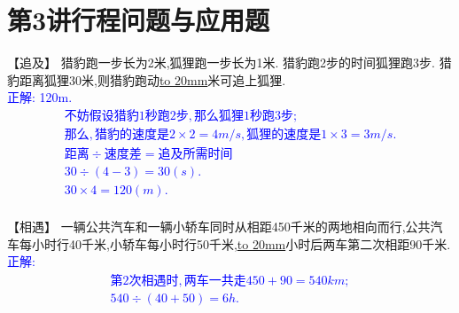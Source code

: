 \section{第3讲\quad 行程问题与应用题}

\item {
    【追及】
    猎豹跑一步长为2米,狐狸跑一步长为1米. 猎豹跑2步的时间狐狸跑3步. 猎豹距离狐狸30米,则猎豹跑动\underline{\hbox to 20mm{}}米可追上狐狸. 
    \ifshowSolution 
        \fangsong{}\textcolor{blue}{
            \\正解: 120m.\\
            \begin{gather*}
                不妨假设猎豹1秒跑2步,那么狐狸1秒跑3步;\\
                那么,猎豹的速度是 2\times 2 = 4m/s, 狐狸的速度是 1\times 3 = 3 m/s. \\
                距离\div 速度差 = 追及所需时间\\
                30\div (4-3) = 30(s). \\
                30 \times 4 = 120 (m).\\
            \end{gather*}
        }
    \else
        \vspace{1cm}
    \fi
}

\item {
    【相遇】
    一辆公共汽车和一辆小轿车同时从相距450千米的两地相向而行,公共汽车每小时行40千米,小轿车每小时行50千米,\underline{\hbox to 20mm{}}小时后两车第二次相距90千米. 
    \ifshowSolution 
        \fangsong{}\textcolor{blue}{
            \\正解: \\
            \begin{gather*}
                第2次相遇时,两车一共走 450+90=540 km;\\
                540\div (40+50) = 6h.\\
            \end{gather*}
        }
    \else
        \vspace{1cm}
    \fi
}

